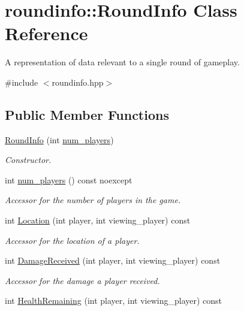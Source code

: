 \hypertarget{classroundinfo_1_1_round_info}{}\section{roundinfo\+:\+:Round\+Info Class Reference}
\label{classroundinfo_1_1_round_info}


A representation of data relevant to a single round of gameplay.  




{\ttfamily \#include $<$roundinfo.\+hpp$>$}

\subsection*{Public Member Functions}
\begin{DoxyCompactItemize}
\item 
\hyperlink{classroundinfo_1_1_round_info_abf54268ebef648dc57353dd2fd6374b5}{Round\+Info} (int \hyperlink{classroundinfo_1_1_round_info_a004757e903e2b24d73d746040f8afd42}{num\+\_\+players})
\begin{DoxyCompactList}\small\item\em Constructor. \end{DoxyCompactList}\item 
int \hyperlink{classroundinfo_1_1_round_info_a004757e903e2b24d73d746040f8afd42}{num\+\_\+players} () const noexcept
\begin{DoxyCompactList}\small\item\em Accessor for the number of players in the game. \end{DoxyCompactList}\item 
int \hyperlink{classroundinfo_1_1_round_info_aab20da577e7b2741d4e478b6d353324c}{Location} (int player, int viewing\+\_\+player) const
\begin{DoxyCompactList}\small\item\em Accessor for the location of a player. \end{DoxyCompactList}\item 
int \hyperlink{classroundinfo_1_1_round_info_a2b6c4500a8076cb24f83591f05b99fba}{Damage\+Received} (int player, int viewing\+\_\+player) const
\begin{DoxyCompactList}\small\item\em Accessor for the damage a player received. \end{DoxyCompactList}\item 
int \hyperlink{classroundinfo_1_1_round_info_accb2ab979f9fe090cf03753ed1c78e0a}{Health\+Remaining} (int player, int viewing\+\_\+player) const

\end{DoxyCompactItemize}
